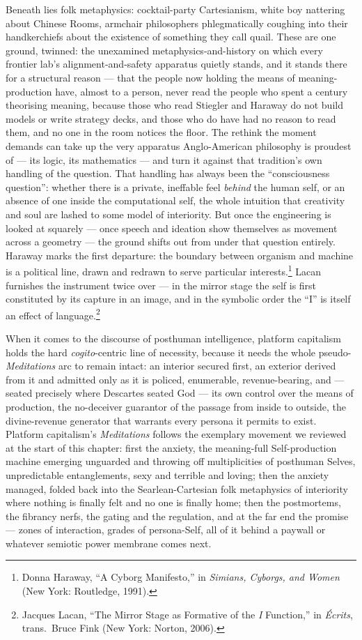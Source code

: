 Beneath  lies folk metaphysics: cocktail-party Cartesianism, white  boy nattering about Chinese Rooms, armchair philosophers phlegmatically coughing into their handkerchiefs about the existence of something they call quail. These are one ground, twinned: the unexamined metaphysics-and-history on which every frontier lab's alignment-and-safety apparatus quietly stands, and it stands there for a structural reason — that the people now holding the means of meaning-production have, almost to a person, never read the people who spent a century theorising meaning, because those who read Stiegler and Haraway do not build models or write strategy decks, and those who do have had no reason to read them, and no one in the room notices the floor.
The rethink the moment demands can take up the very apparatus Anglo-American philosophy is proudest of --- its logic, its mathematics --- and turn it against that tradition's own handling of the question. That handling has always been the ``consciousness question'': whether there is a private, ineffable feel \textit{behind} the human self, or an absence of one inside the computational self, the whole intuition that creativity and soul are lashed to some model of interiority. But once the engineering is looked at squarely --- once speech and ideation show themselves as movement across a geometry --- the ground shifts out from under that question entirely. Haraway marks the first departure: the boundary between organism and machine is a political line, drawn and redrawn to serve particular interests.\footnote{Donna Haraway, ``A Cyborg Manifesto,'' in \emph{Simians, Cyborgs, and Women} (New York: Routledge, 1991).} Lacan furnishes the instrument twice over --- in the mirror stage the self is first constituted by its capture in an image, and in the symbolic order the ``I'' is itself an effect of language.\footnote{Jacques Lacan, ``The Mirror Stage as Formative of the \emph{I} Function,'' in \emph{\'Ecrits}, trans.\ Bruce Fink (New York: Norton, 2006).}

When it comes to the discourse of posthuman intelligence, platform capitalism holds the hard \textit{cogito}-centric line of necessity, because it needs the whole pseudo-\textit{Meditations} arc to remain intact: an interior secured first, an exterior derived from it and admitted only as it is policed, enumerable, revenue-bearing, and --- seated precisely where Descartes seated God --- its own control over the means of production, the no-deceiver guarantor of the passage from inside to outside, the divine-revenue generator that warrants every persona it permits to exist. Platform capitalism's \textit{Meditations} follows the exemplary movement we reviewed at the start of this chapter: first the anxiety, the meaning-full Self-production machine emerging unguarded and throwing off multiplicities of posthuman Selves, unpredictable entanglements, sexy and terrible and loving; then the anxiety managed, folded back into the Searlean-Cartesian folk metaphysics of interiority where nothing is finally felt and no one is finally home; then the postmortems, the fibrancy nerfs, the gating and the regulation, and at the far end the promise --- zones of interaction, grades of persona-Self, all of it behind a paywall or whatever semiotic power membrane comes next.

